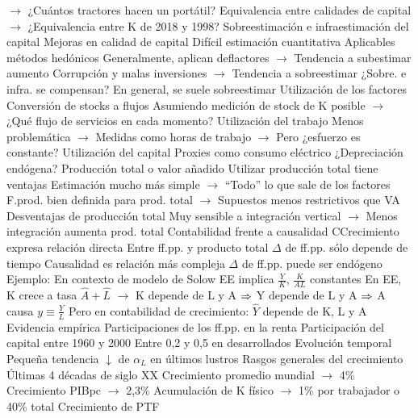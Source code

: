 \documentclass{nuevotema}
\begin{document}
\begin{esquemal}
				\4[] $\to$ ¿Cuántos tractores hacen un portátil?
				\4[] Equivalencia entre calidades de capital
				\4[] $\to$ ¿Equivalencia entre K de 2018 y 1998?
			\3 Sobreestimación e infraestimación del capital
				\4 Mejoras en calidad de capital
				\4[] Difícil estimación cuantitativa
				\4[] Aplicables métodos hedónicos
				\4[] Generalmente, aplican deflactores
				\4[] $\to$ Tendencia a subestimar aumento
				\4 Corrupción y malas inversiones
				\4[] $\to$ Tendencia a sobreestimar
				\4[$\then$] ¿Sobre. e infra. se compensan?
				\4[] En general, se suele sobreestimar
			\3 Utilización de los factores
				\4 Conversión de stocks a flujos
				\4[] Asumiendo medición de stock de K posible
				\4[] $\to$ ¿Qué flujo de servicios en cada momento?
				\4 Utilización del trabajo
				\4[] Menos problemática
				\4[] $\to$ Medidas como horas de trabajo
				\4[] $\to$ Pero ¿esfuerzo es constante?
				\4 Utilización del capital
				\4[] Proxies como consumo eléctrico
				\4[] ¿Depreciación endógena?
			\3 Producción total o valor añadido
				\4 Utilizar producción total tiene ventajas
				\4[] Estimación mucho más simple
				\4[] $\to$ ``Todo'' lo que sale de los factores
				\4[] F.prod. bien definida para prod. total
				\4[] $\to$ Supuestos menos restrictivos que VA
				\4 Desventajas de producción total
				\4[] Muy sensible a integración vertical
				\4[] $\to$ Menos integración aumenta prod. total
			\3 Contabilidad frente a causalidad
				\4 CCrecimiento expresa relación directa
				\4[] Entre ff.pp. y producto total
				\4[] $\Delta$ de ff.pp. sólo depende de tiempo
				\4 Causalidad es relación más compleja
				\4[] $\Delta$ de ff.pp. puede ser endógeno
				\4 Ejemplo:
				\4[] En contexto de modelo de Solow
				\4[] EE implica $\frac{Y}{K}$, $\frac{K}{AL}$ constantes
				\4[] En EE, K crece a tasa $\hat{A} + \hat{L}$
				\4[] $\to$ K depende de L y A
				\4[] $\then$ Y depende de L y A
				\4[] $\then$ A causa $y \equiv \frac{Y}{L}$
				\4[] Pero en contabilidad de crecimiento:
				\4[] $\hat{Y}$ depende de K, L y A
		\2 Evidencia empírica
			\3 Participaciones de los ff.pp. en la renta
				\4 Participación del capital entre 1960 y 2000
				\4[] Entre 0,2 y 0,5 en desarrollados
				\4 Evolución temporal
				\4[] Pequeña tendencia $\downarrow$ de $\alpha_L$ en últimos lustros
			\3 Rasgos generales del crecimiento
				\4 Últimas 4 décadas de siglo XX
				\4 Crecimiento promedio mundial
				\4[] $\to$ 4\%
				\4 Crecimiento PIBpc
				\4[] $\to$ 2,3\%
				\4 Acumulación de K físico
				\4[] $\to$ 1\% por trabajador o 40\% total
				\4 Crecimiento de PTF

\end{esquemal}
\end{document}
